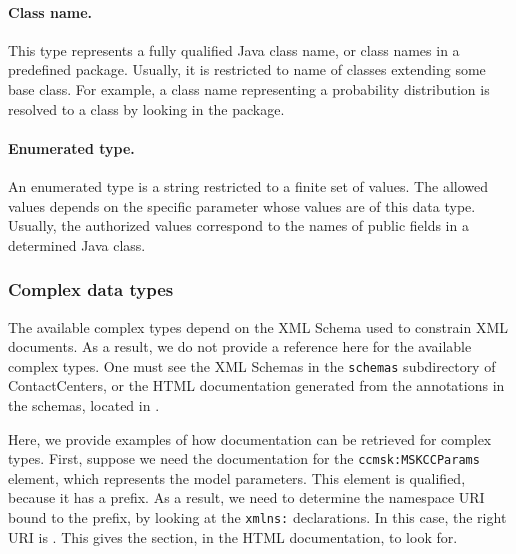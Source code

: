 \paragraph{Class name.}
This type represents a fully qualified Java class name,
or class names in a predefined package.  Usually, it
is restricted to name of classes extending some base class.
For example, a class name representing a probability distribution
is resolved to a class by looking in the
 package.

\paragraph{Enumerated type.}
An enumerated type is a string restricted to a finite set of values.
The allowed values depends on the specific parameter whose values are
of this data type.
Usually, the authorized values correspond to the names of public
fields in a determined Java class.


\subsubsection{Complex data types}
\label{sec:complexdatatypes}

The available complex types depend on the XML Schema used to constrain
XML documents. As a result, we do not provide a reference here for the
available complex types.  One must see the XML Schemas in the
\texttt{schemas} subdirectory of ContactCenters, or
the HTML documentation generated from the annotations in the schemas,
located in .

Here, we provide examples of how documentation can be retrieved for
complex types.
First, suppose we need the documentation for the
\texttt{ccmsk:MSKCCParams} element, which
represents the model parameters.
This element is qualified, because it has a prefix.
As a result, we need to determine the namespace URI bound
to the prefix, by looking at the \texttt{xmlns:} declarations.
In this case, the right URI is
.
This gives the section, in the HTML documentation, to look for.

